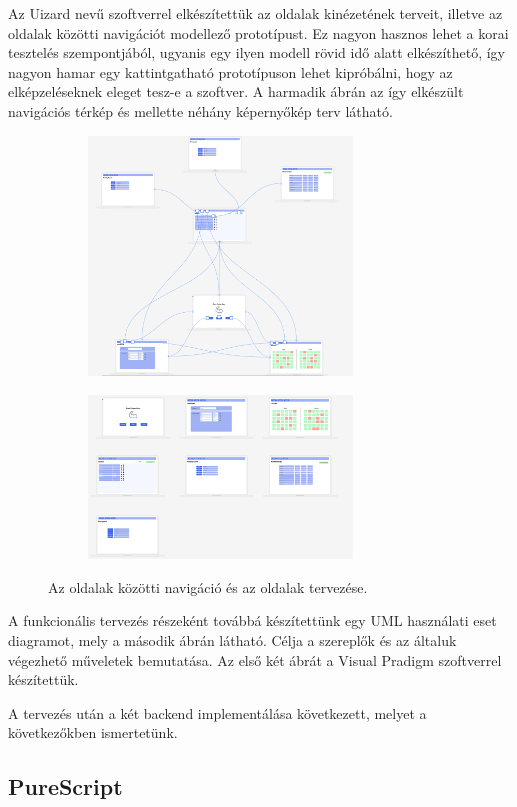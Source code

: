 \documentclass[12pt]{article}
\begin{document}
Az Uizard\cite{uizard} nevű szoftverrel elkészítettük az oldalak kinézetének terveit, illetve az oldalak közötti navigációt modellező prototípust. Ez nagyon hasznos lehet a korai tesztelés szempontjából, ugyanis egy ilyen modell rövid idő alatt elkészíthető, így nagyon hamar egy kattintgatható prototípuson lehet kipróbálni, hogy az elképzeléseknek eleget tesz-e a szoftver. A harmadik ábrán az így elkészült navigációs térkép és mellette néhány képernyőkép terv látható.
\begin{figure}[h!]
\centering
\begin{subfigure}{0.45\textwidth}
\includegraphics[width=7cm]{navigation} 
\end{subfigure}
\begin{subfigure}{0.4\textwidth}
\includegraphics[width=7cm]{pages}
\end{subfigure}
\caption{Az oldalak közötti navigáció és az oldalak tervezése.}
\end{figure}

A funkcionális tervezés részeként továbbá készítettünk egy UML használati eset diagramot, mely a második ábrán látható. Célja a szereplők és az általuk végezhető műveletek bemutatása. Az első két ábrát a Visual Pradigm szoftverrel készítettük.

A tervezés után a két backend implementálása következett, melyet a következőkben ismertetünk.

\newpage
\subsection{PureScript}
\end{document}
